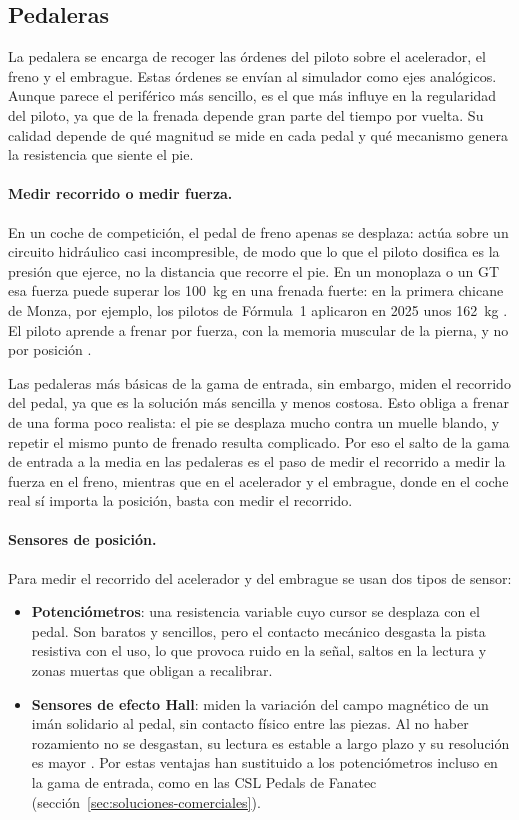 \subsection{Pedaleras}
\label{sec:pedaleras}
La pedalera se encarga de recoger las órdenes del piloto sobre el acelerador, el freno y el embrague. Estas órdenes se envían al simulador como ejes analógicos. Aunque parece el periférico más sencillo, es el que más influye en la regularidad del piloto, ya que de la frenada depende gran parte del tiempo por vuelta. Su calidad depende de qué magnitud se mide en cada pedal y qué mecanismo genera la resistencia que siente el pie.

\paragraph{Medir recorrido o medir fuerza.}
En un coche de competición, el pedal de freno apenas se desplaza: actúa sobre un circuito hidráulico
casi incompresible, de modo que lo que el piloto dosifica es la presión que ejerce, no la distancia que recorre el pie. En un monoplaza o un GT esa fuerza puede superar los 100~kg en una frenada fuerte: en la primera chicane de Monza, por ejemplo, los pilotos de Fórmula~1 aplicaron en 2025 unos 162~kg \parencite{brembo_2025_f1_numbers}. El piloto aprende a frenar por fuerza, con la memoria muscular de la pierna, y no por posición \parencite{segel_1970_pedal_force}.

Las pedaleras más básicas de la gama de entrada, sin embargo, miden el recorrido del pedal, ya que es la solución más sencilla y menos costosa. Esto obliga a frenar de una forma poco realista: el pie se desplaza mucho contra un muelle blando, y repetir el mismo punto de frenado resulta complicado. Por eso el salto de la gama de entrada a la media en las pedaleras es el paso de medir el recorrido a medir la fuerza en el freno, mientras que en el acelerador y el embrague, donde en el coche real sí importa la posición, basta con medir el recorrido.

\paragraph{Sensores de posición.}
Para medir el recorrido del acelerador y del embrague se usan dos tipos de sensor:
\begin{itemize}
	\item \textbf{Potenciómetros}: una resistencia variable cuyo cursor se desplaza con el pedal. Son
	baratos y sencillos, pero el contacto mecánico desgasta la pista resistiva con el uso, lo que
	provoca ruido en la señal, saltos en la lectura y zonas muertas que obligan a recalibrar.
	\item \textbf{Sensores de efecto Hall}: miden la variación del campo magnético de un imán solidario
	al pedal, sin contacto físico entre las piezas. Al no haber rozamiento no se desgastan, su lectura es
	estable a largo plazo y su resolución es mayor \parencite{ramsden_2006_hall}. Por estas ventajas han sustituido a los
	potenciómetros incluso en la gama de entrada, como en las CSL Pedals de Fanatec
	(sección~\ref{sec:soluciones-comerciales}).
\end{itemize}

